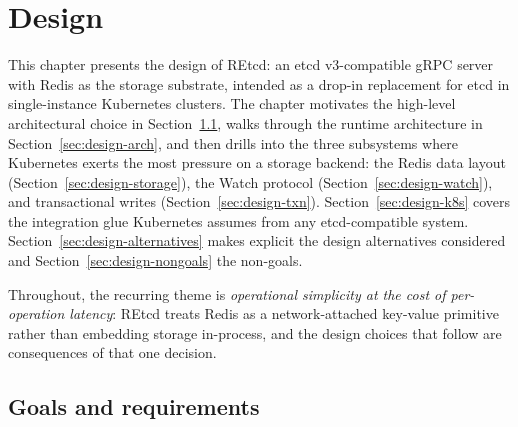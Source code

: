 %
%
%

\chapter{Design}
\label{ch:design}

This chapter presents the design of REtcd: an etcd v3-compatible gRPC server with Redis as the storage substrate, intended as a drop-in replacement for etcd in single-instance Kubernetes clusters. The chapter motivates the high-level architectural choice in Section~\ref{sec:design-goals}, walks through the runtime architecture in Section~\ref{sec:design-arch}, and then drills into the three subsystems where Kubernetes exerts the most pressure on a storage backend: the Redis data layout (Section~\ref{sec:design-storage}), the Watch protocol (Section~\ref{sec:design-watch}), and transactional writes (Section~\ref{sec:design-txn}). Section~\ref{sec:design-k8s} covers the integration glue Kubernetes assumes from any etcd-compatible system. Section~\ref{sec:design-alternatives} makes explicit the design alternatives considered and Section~\ref{sec:design-nongoals} the non-goals.

Throughout, the recurring theme is \emph{operational simplicity at the cost of per-operation latency}: REtcd treats Redis as a network-attached key-value primitive rather than embedding storage in-process, and the design choices that follow are consequences of that one decision.

\section{Goals and requirements}
\label{sec:design-goals}

